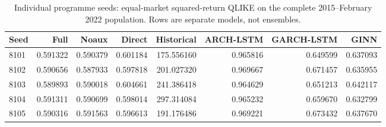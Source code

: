 \begin{table}[H]\centering
\begingroup\footnotesize\setlength{\tabcolsep}{3pt}
\caption[Training-component gains by seed]{Individual programme seeds: equal-market squared-return QLIKE on the complete 2015--February 2022 population. Rows are separate models, not ensembles.}\label{tab:new-programme-seeds}
\begin{tabular}{@{}lrrrrrrr@{}}
\toprule
Seed & Full & Noaux & Direct & Historical & ARCH-LSTM & GARCH-LSTM & GINN \\
\midrule
8101 & 0.591322 & 0.590379 & 0.601184 & 175.556160 & 0.965816 & 0.649599 & 0.637093 \\
8102 & 0.590656 & 0.587933 & 0.597818 & 201.027320 & 0.969667 & 0.671457 & 0.635955 \\
8103 & 0.589893 & 0.590018 & 0.604661 & 241.386418 & 0.964629 & 0.651213 & 0.642117 \\
8104 & 0.591311 & 0.590699 & 0.598014 & 297.314084 & 0.965232 & 0.659670 & 0.632799 \\
8105 & 0.590316 & 0.591563 & 0.596613 & 191.176486 & 0.969221 & 0.673432 & 0.637670 \\
\bottomrule
\end{tabular}\endgroup\end{table}
